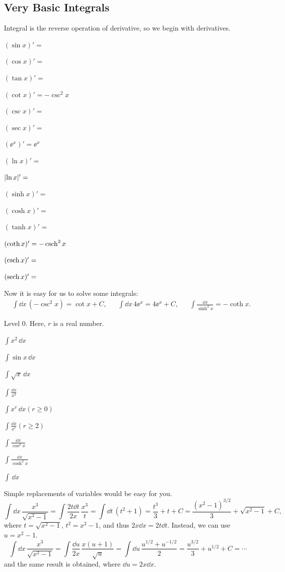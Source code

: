 \documentclass[11pt,pdfa,lastpage]{MishoNote}
\newcommand\intdx{\displaystyle\int\!\dd x\,}
\newcommand\INT[2][\relax]{\item$\displaystyle\int\!#2\,\dd x$\ifx\relax#1\relax\relax\relax\else{\quad#1}\fi}
\newcommand\INN[2][\relax]{\item$\displaystyle\int\!#2$\ifx\relax#1\relax\relax\relax\else{\quad#1}\fi}
\begin{document}
\subsection{Very Basic Integrals}
Integral is the reverse operation of derivative, so we begin with derivatives.
\begin{menumerate}{3}
  \item[\textbullet] $(\sin x)'=$
  \item[\textbullet] $(\cos x)'=$
  \item[\textbullet] $(\tan x)'=$
  \item[\textbullet] $(\cot x)'=-\csc^2x$
  \item[\textbullet] $(\csc x)'=$
  \item[\textbullet] $(\sec x)'=$
  \item[\textbullet] $(\ee^x)'=\ee^x$
  \item[\textbullet] $(\ln x)'=$
  \item[\textbullet] $\abs{\ln x}'=$
  \item[\textbullet] $(\sinh x)'=$
  \item[\textbullet] $(\cosh x)'=$
  \item[\textbullet] $(\tanh x)'=$
  \item[\textbullet] $(\coth x)'=-\operatorname{\mathrm{csch}}^2x$
  \item[\textbullet] $(\operatorname{\mathrm{csch}} x)'=$
  \item[\textbullet] $(\operatorname{\mathrm{sech}} x)'=$
\end{menumerate}
\begin{quizzes}
\end{quizzes}
Now it is easy for us to solve some integrals:
\begin{align}
  &\intdx (-\csc^2x)=\cot x+C,&
  &\intdx 4\ee^x=4\ee^x+C,&
  &\int \frac{\dd x}{\sinh^2x}=-\coth x.
\end{align}


\begin{problems}
\Problem[A] Level 0. Here, $r$ is a real number.
\begin{menumerate}{3}
  \INT{x^2}
  \INT{\sin x}
  \INT{\sqrt x}
  \INN{\frac{\dd x}{x^2}}
  \INT[$(r\ge 0)$]{x^r}
  \INN[$(r\ge 2)$]{\frac{\dd x}{x^r}}
  \INN{\frac{\dd x}{\cos^2x}}
  \INN{\frac{\dd x}{\cosh^2x}}
  \INT{}
\end{menumerate}
\end{problems}

Simple replacements of variables would be easy for you.
\[
\intdx\frac{x^3}{\sqrt{x^2-1}}= \int\!\frac{2t\dd t}{2x}\,\frac{x^3}{t}=\int\!\dd t\,(t^2+1)=\frac{t^3}3+t+C=
\frac{(x^2-1)^{3/2}}3+\sqrt{x^2-1}+C,
\]
where $t=\sqrt{x^2-1}$, $t^2=x^2-1$, and thus $2x\dd x=2t\dd t$. Instead, we can use $u=x^2-1$.
\[
\intdx\frac{x^3}{\sqrt{x^2-1}}= \int\!\frac{\dd u}{2x}\,\frac{x(u+1)}{\sqrt{u}}
=\int\!\dd u\,\frac{u^{1/2}+u^{-1/2}}2
=\frac{u^{3/2}}{3}+u^{1/2}+C=\cdots
\]
and the same result is obtained, where $\dd u=2x\dd x$.
\end{document}
